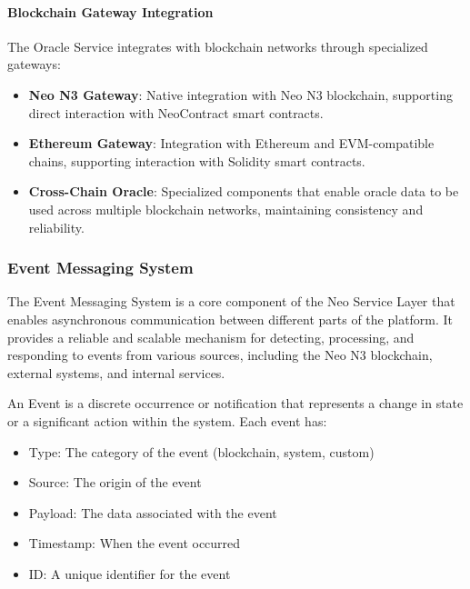 \paragraph{Blockchain Gateway Integration}
The Oracle Service integrates with blockchain networks through specialized gateways:

\begin{itemize}
    \item \textbf{Neo N3 Gateway}: Native integration with Neo N3 blockchain, supporting direct interaction with NeoContract smart contracts.
    
    \item \textbf{Ethereum Gateway}: Integration with Ethereum and EVM-compatible chains, supporting interaction with Solidity smart contracts.
    
    \item \textbf{Cross-Chain Oracle}: Specialized components that enable oracle data to be used across multiple blockchain networks, maintaining consistency and reliability.
\end{itemize}

\subsubsection{Event Messaging System}
\label{subsubsec:event-messaging}

The Event Messaging System is a core component of the Neo Service Layer that enables asynchronous communication between different parts of the platform. It provides a reliable and scalable mechanism for detecting, processing, and responding to events from various sources, including the Neo N3 blockchain, external systems, and internal services.



\begin{definition}[Event]
An Event is a discrete occurrence or notification that represents a change in state or a significant action within the system. Each event has:
\begin{itemize}
    \item Type: The category of the event (blockchain, system, custom)
    \item Source: The origin of the event
    \item Payload: The data associated with the event
    \item Timestamp: When the event occurred
    \item ID: A unique identifier for the event
\end{itemize}
\end{definition}


